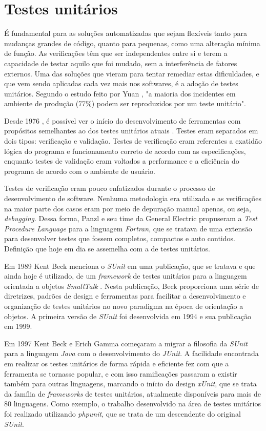 \hypertarget{testes-unitarios}{%
\section{Testes unitários}\label{testes-unitarios}}

É fundamental para as soluções automatizadas que sejam flexíveis tanto para mudanças grandes de código, quanto para pequenas, como uma alteração mínima de função. As verificações têm que ser independentes entre si e terem a capacidade de testar aquilo que foi mudado, sem a interferência de fatores externos. Uma das soluções que vieram para tentar remediar estas dificuldades, e que vem sendo aplicadas cada vez mais nos softwares, é a adoção de testes unitários. Segundo o estudo feito por Yuan \cite{yuan}, "a maioria dos incidentes em ambiente de produção (77\%) podem ser reproduzidos por um teste unitário".

Desde 1976 , é possível ver o início do desenvolvimento de ferramentas com propósitos semelhantes ao dos testes unitários atuais \cite{panzl}. Testes eram separados em dois tipos: verificação e validação. Testes de verificação eram referentes a exatidão lógica do programa e funcionamento correto de acordo com as especificações, enquanto testes de validação eram voltados a performance e a eficiência do programa de acordo com o ambiente de usuário.

Testes de verificação eram pouco enfatizados durante o processo de desenvolvimento de software. Nenhuma metodologia era utilizada e as verificações na maior parte dos casos eram por meio de depuração manual apenas, ou seja, \emph{debugging}. Dessa forma, Panzl e seu time da General Electric propuseram a \emph{Test Procedure Language} para a linguagem \emph{Fortran}, que se tratava de uma extensão para desenvolver testes que fossem completos, compactos e auto contidos. Definição que hoje em dia se assemelha com a de testes unitários.

Em 1989 Kent Beck menciona o \emph{SUnit} em uma publicação, que se tratava e que ainda hoje é utilizado, de um \emph{framework} de testes unitários para a linguagem orientada a objetos \emph{SmallTalk} \cite{beck2}. Nesta publicação, Beck proporciona uma série de diretrizes, padrões de design e ferramentas para facilitar a desenvolvimento e organização de testes unitários no novo paradigma na época de orientação a objetos. A primeira versão de \emph{SUnit} foi desenvolvida em 1994 e sua publicação em 1999.

Em 1997 Kent Beck e Erich Gamma começaram a migrar a filosofia da \emph{SUnit} para a linguagem \emph{Java} com o desenvolvimento do \emph{JUnit}. A facilidade encontrada em realizar os testes unitários de forma rápida e eficiente fez com que a ferramenta se tornasse popular, e com isso ramificações passaram a existir também para outras linguagens, marcando o início do design \emph{xUnit}, que se trata da família de \emph{frameworks} de testes unitários, atualmente disponíveis para mais de 80 linguagens. Como exemplo, o trabalho desenvolvido na área de testes unitários foi realizado utilizando \emph{phpunit}, que se trata de um descendente do original \emph{SUnit}.

